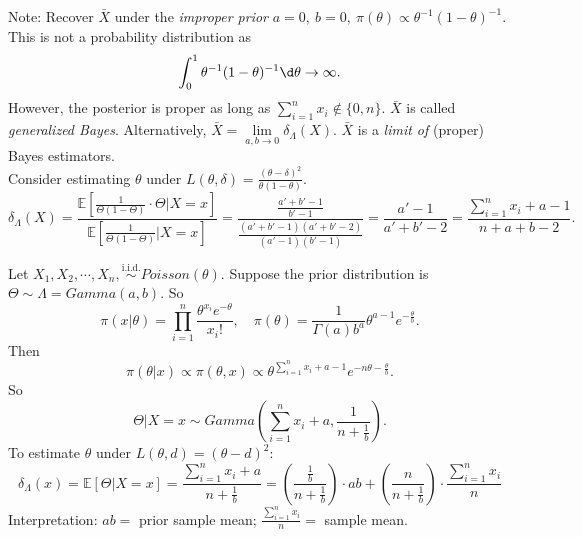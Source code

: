 \documentclass[a4paper]{article}
\begin{document}
\begin{eg}
	\noindent Note: Recover $\bar{X}$ under the \emph{improper prior} $a = 0, \ b = 0, \ \pi(\theta) \propto \theta^{-1} (1-\theta)^{-1}$. This is not a probability distribution as
	\begin{equation*}
		\int_{0}^1 \theta^{-1} (1-\theta)^{-1} \d \theta \to \infty.
	\end{equation*}
	However, the posterior is proper as long as $\sum\limits_{i=1}^n x_i \notin \{0,n\}$. $\bar{X}$ is called \emph{generalized Bayes}. Alternatively, $\bar{X} = \lim\limits_{a,b \to 0} \delta_{\Lambda}(X)$. $\bar{X}$ is a \emph{limit of} (proper) Bayes estimators.\\
	
	\noindent Consider estimating $\theta$ under $L(\theta,\delta) = \frac{(\theta - \delta)^2}{\theta(1-\theta)}$.
	\begin{equation}
		\delta_{\Lambda}(X) = \frac{\mathbb{E}[\frac{1}{\Theta(1-\Theta)} \cdot \Theta | X = x]}{\mathbb{E}[\frac{1}{\Theta(1-\Theta)} | X = x]} = \frac{\frac{a'+b'-1}{b'-1}}{\frac{(a'+b'-1)(a'+b'-2)}{(a'-1)(b'-1)}} = \frac{a'-1}{a'+b'-2} = \frac{\sum\limits_{i=1}^n x_i + a - 1}{n + a + b - 2}.
	\end{equation}
\end{eg}

\begin{eg}
	Let $X_1,X_2,\cdots,X_n,\stackrel{\text{i.i.d.}}{\sim} Poisson(\theta)$. Suppose the prior distribution is $\Theta \sim \Lambda = Gamma(a,b)$. So
	\begin{equation*}
		\pi(x|\theta) = \prod\limits_{i=1}^n \frac{\theta^{x_i}e^{-\theta}}{x_i!}, \quad \pi(\theta) = \frac{1}{\Gamma(a)b^a}\theta^{a-1}e^{-\frac{\theta}{b}}.
	\end{equation*}
	Then
	\begin{equation*}
		\pi(\theta|x) \propto \pi(\theta,x) \propto \theta^{\sum\limits_{i = 1}^n x_i + a -1} e^{-n\theta-\frac{\theta}{b}}.
	\end{equation*}
	So
	\begin{equation*}
		\Theta|X = x \sim Gamma\left(\sum\limits_{i = 1}^n x_i + a,\frac{1}{n + \frac{1}{b}}\right).
	\end{equation*}
	To estimate $\theta$ under $L(\theta,d) = (\theta - d)^2$:
	\begin{equation}
		\delta_{\Lambda}(x) = \mathbb{E}[\Theta|X=x] = \frac{\sum\limits_{i = 1}^n x_i + a}{n + \frac{1}{b}} = \left(\frac{\frac{1}{b}}{n + \frac{1}{b}}\right) \cdot ab + \left(\frac{n}{n + \frac{1}{b}}\right) \cdot \frac{\sum\limits_{i = 1}^n x_i}{n}
	\end{equation}
	Interpretation: $ab = $ prior sample mean;  $\frac{\sum\limits_{i=1}^n x_i}{n} = $ sample mean.
\end{eg}
\end{document}
